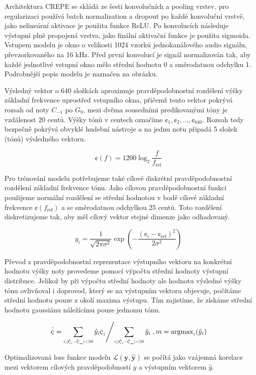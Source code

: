 Architektura CREPE se skládá ze šesti konvolučních a pooling vrstev, pro regularizaci používá batch normalization a dropout po každé konvoluční vrstvě, jako nelineární aktivace je použita funkce ReLU. Po konvolucích následuje výstupní plně propojená vrstva, jako finální aktivační funkce je použita sigmoida. Vstupem modelu je okno o velikosti 1024 vzorků jednokanálového audio signálu, převzorkovaného na 16 kHz. Před první konvolucí je signál normalizován tak, aby každé jednotlivé vstupní okno mělo střední hodnotu 0 a směrodatnou odchylku 1. Podrobnější popis modelu je naznačen na obrázku.

Výsledný vektor o 640 složkách aproximuje pravděpodobnostní rozdělení výšky základní frekvence uprostřed vstupního okna, přičemž tento vektor pokrývá rozsah od noty $C_{-1}$ po $G_{9}$, mezi dvěma sousedními predikovanými tóny je vzdálenost 20 centů. Výšky tónů v centech označíme $\cent_1, \cent_2, \dots, \cent_{640}$. Rozsah tedy bezpečně pokrývá obvyklé hudební nástroje a na jednu notu připadá 5 složek (tónů) výsledného vektoru.

    $$\cent(f) = 1200 \log_2{\frac{f}{f_{\mathrm{ref}}}}$$

Pro trénování modelu potřebujeme také cílové diskrétní pravděpodobnostní rozdělení základní frekvence tónu. Jako cílovou pravděpodobnostní funkci použijeme normální rozdělení se střední hodnotou v bodě cílové základní frekvence $\cent(f_{\mathrm{ref}})$ a se směrodatnou odchylkou 25 centů. Toto rozdělení diskretizujeme tak, aby měl cílový vektor stejné dimenze jako odhadovaný.

    $$y_i = \frac{1}{\sqrt{2 \pi \sigma^2}}\exp{(-\frac{(\cent_i - \cent_{\mathrm{ref}})^2}{2 \sigma^2})}$$

Převod z pravděpodobnostní reprezentace výstupního vektoru na konkrétní hodnotu výšky noty provedeme pomocí výpočtu střední hodnoty výstupní distribuce. Jelikož by při výpočtu střední hodnoty ale hodnotu výsledné výšky tónu ovlivňoval i doprovod, který se na výstupním vektoru objevuje, počítáme střední hodnotu pouze z okolí maxima výstupu. Tím zajistíme, že získáme střední hodnotu gaussiánu náležícímu pouze jednomu tónu.

    $$ \left. \hat{\cent} = \sum_{\scaleto{i, \lvert \cent_i - \cent_m \rvert < 50}{8pt}} {\hat{y}_i \cent_i} \middle/ \sum_{\scaleto{i, \lvert \cent_i - \cent_m \rvert < 50}{8pt}} \hat{y}_i \right., m = \mathrm{argmax}_i(\hat{y}_i)$$

Optimalizovaná loss funkce modelu $\mathcal{L}(\mathbf{y}, \mathbf{\hat{y}})$ se počítá jako vzájemná korelace mezi vektorem cílových pravděpodobností $y$ a výstupním vektorem $\hat{y}$.

